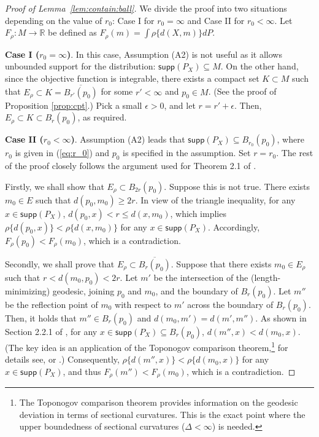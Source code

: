 \documentclass[preprint]{imsart}
\theoremstyle{plain}
\theoremstyle{remark}
\begin{document}
\begin{appendix}
\begin{proof}[Proof of Lemma~\ref{lem:contain:ball}]

  We divide the proof into two situations depending on the value of $r_0$: Case I for $r_0 = \infty$ and Case II for $r_0 <\infty$. Let $F_\rho: M \to \mathbb{R}$ be defined as $F_\rho(m) = \int \rho\{d(X,m)\} dP$.


\textbf{Case I ($r_0 = \infty$)}. In this case, Assumption (A2) is not useful as it allows unbounded support for the distribution: $\textsf{supp}(P_{X}) \subseteq M$. On the other hand, since the objective function is integrable, there exists a compact set $K \subset M$ such that $E_{\rho} \subset  K = \overline{B_{r'}(p_0)}$ for some $r' <\infty$ and $p_0 \in M$. (See the proof of Proposition \ref{prop:cpt}.) Pick a small $\epsilon > 0$, and let $r = r' + \epsilon$. Then, $E_{\rho} \subset K \subset B_r(p_0)$, as required. 

\textbf{Case II ($r_0 <\infty$)}. Assumption (A2) leads that $\textsf{supp}(P_{X}) \subseteq B_{r_0}(p_0)$, where $r_0$ is given in (\ref{eq:r_0}) and $p_0$ is specified in the assumption. Set $r = r_0$. 
The rest of the proof closely follows the argument used for Theorem 2.1 of \cite{afsari2011riemannian}. 


Firstly, we shall show that $E_{\rho} \subset B_{2r}(p_0)$. Suppose this is not true. There exists $m_0 \in E$ such that $d(p_0, m_0) \ge 2r$. In view of the triangle inequality, for any $x \in \textsf{supp}(P_{X})$, $d(p_0, x) < r \le d(x, m_0)$, which implies $\rho\{d(p_0, x)\} < \rho\{d(x, m_0)\}$ for any $x \in \textsf{supp}(P_{X})$. Accordingly, $F_\rho(p_0) < F_\rho(m_0)$, which is a contradiction. 

Secondly, we shall prove that $E_{\rho} \subset \overline{B_{r}(p_0)}$. Suppose that there exists $m_0 \in E_{\rho}$ such that $r < d(m_0, p_0) < 2r$. Let $m'$ be the intersection of the (length-minimizing) geodesic, joining $p_{0}$ and $m_0$, and the boundary of $B_{r}(p_0)$. Let $m''$ be the reflection point of $m_0$ with respect to $m'$ across the boundary of $B_{r}(p_0)$. Then, it holds that $m'' \in B_{r}(p_0)$ and $d(m_0, m')=d(m', m'')$. As shown in Section 2.2.1 of \cite{afsari2011riemannian}, for any $x \in \textsf{supp}(P_{X}) \subseteq B_{r}(p_0)$, $d(m'', x) < d(m_{0}, x)$. (The key idea is an application of the Toponogov comparison theorem,\footnote{The Toponogov comparison theorem provides information on the geodesic deviation in terms of sectional curvatures. This is the exact point where the upper boundedness of sectional curvatures ($\Delta < \infty$) is needed.} for details see, \citep[page. 420,][]{chavel2006riemannian} 
or \citep[Theorem 2.2,][]{afsari2011riemannian}.) Consequently, $\rho\{d(m'', x)\} < \rho\{d(m_{0}, x)\}$ for any $x \in \textsf{supp}(P_{X})$, and thus $F_\rho(m'') < F_\rho(m_{0})$, which is a contradiction.


\end{proof}
\end{appendix}
\end{document}
